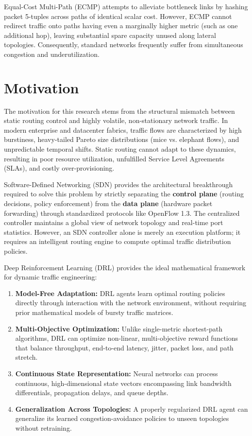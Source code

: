 \documentclass[12pt,a4paper,oneside]{report}
\begin{document}
Equal-Cost Multi-Path (ECMP) attempts to alleviate bottleneck links by hashing packet 5-tuples across paths of identical scalar cost. However, ECMP cannot redirect traffic onto paths having even a marginally higher metric (such as one additional hop), leaving substantial spare capacity unused along lateral topologies. Consequently, standard networks frequently suffer from simultaneous congestion and underutilization.

\section{Motivation}
The motivation for this research stems from the structural mismatch between static routing control and highly volatile, non-stationary network traffic. In modern enterprise and datacenter fabrics, traffic flows are characterized by high burstiness, heavy-tailed Pareto size distributions (mice vs. elephant flows), and unpredictable temporal shifts. Static routing cannot adapt to these dynamics, resulting in poor resource utilization, unfulfilled Service Level Agreements (SLAs), and costly over-provisioning.

Software-Defined Networking (SDN) provides the architectural breakthrough required to solve this problem by strictly separating the \textbf{control plane} (routing decisions, policy enforcement) from the \textbf{data plane} (hardware packet forwarding) through standardized protocols like OpenFlow 1.3. The centralized controller maintains a global view of network topology and real-time port statistics. However, an SDN controller alone is merely an execution platform; it requires an intelligent routing engine to compute optimal traffic distribution policies.

Deep Reinforcement Learning (DRL) provides the ideal mathematical framework for dynamic traffic engineering:
\begin{enumerate}
    \item \textbf{Model-Free Adaptation:} DRL agents learn optimal routing policies directly through interaction with the network environment, without requiring prior mathematical models of bursty traffic matrices.
    \item \textbf{Multi-Objective Optimization:} Unlike single-metric shortest-path algorithms, DRL can optimize non-linear, multi-objective reward functions that balance throughput, end-to-end latency, jitter, packet loss, and path stretch.
    \item \textbf{Continuous State Representation:} Neural networks can process continuous, high-dimensional state vectors encompassing link bandwidth differentials, propagation delays, and queue depths.
    \item \textbf{Generalization Across Topologies:} A properly regularized DRL agent can generalize its learned congestion-avoidance policies to unseen topologies without retraining.
\end{enumerate}
\end{document}
